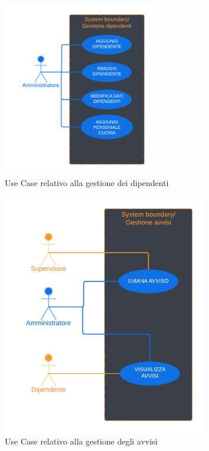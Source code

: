     \begin{figure}[H]
        \centering
        \includegraphics[width=0.6\textwidth]{assets/diagrammi/Use-Case/Gestione dipendenti.png}
        \caption{Use Case relativo alla gestione dei dipendenti}
        \label{fig:ucdWorkersMgmt}
    \end{figure}

    \begin{figure}[H]
        \centering
        \includegraphics[width=0.8\textwidth]{assets/diagrammi/Use-Case/Gestione avvisi.png}
        \caption{Use Case relativo alla gestione degli avvisi}
        \label{fig:ucdAdvMgmt}
    \end{figure}

\newpage